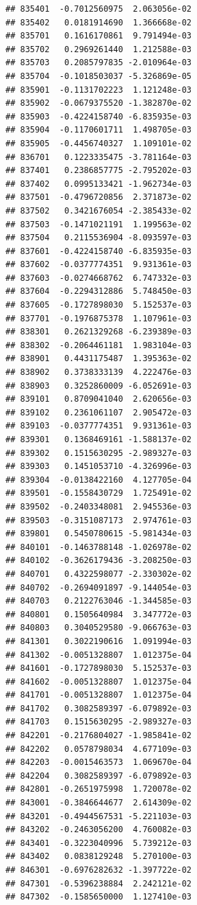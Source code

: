 \documentclass[ignorenonframetext,]{beamer}
\begin{document}
\begin{frame}[fragile]
\begin{verbatim}
## 835401  -0.7012560975  2.063056e-02
## 835402   0.0181914690  1.366668e-02
## 835701   0.1616170861  9.791494e-03
## 835702   0.2969261440  1.212588e-03
## 835703   0.2085797835 -2.010964e-03
## 835704  -0.1018503037 -5.326869e-05
## 835901  -0.1131702223  1.121248e-03
## 835902  -0.0679375520 -1.382870e-02
## 835903  -0.4224158740 -6.835935e-03
## 835904  -0.1170601711  1.498705e-03
## 835905  -0.4456740327  1.109101e-02
## 836701   0.1223335475 -3.781164e-03
## 837401   0.2386857775 -2.795202e-03
## 837402   0.0995133421 -1.962734e-03
## 837501  -0.4796720856  2.371873e-02
## 837502   0.3421676054 -2.385433e-02
## 837503  -0.1471021191  1.199563e-02
## 837504   0.2115536904 -8.093597e-03
## 837601  -0.4224158740 -6.835935e-03
## 837602  -0.0377774351  9.931361e-03
## 837603  -0.0274668762  6.747332e-03
## 837604  -0.2294312886  5.748450e-03
## 837605  -0.1727898030  5.152537e-03
## 837701  -0.1976875378  1.107961e-03
## 838301   0.2621329268 -6.239389e-03
## 838302  -0.2064461181  1.983104e-03
## 838901   0.4431175487  1.395363e-02
## 838902   0.3738333139  4.222476e-03
## 838903   0.3252860009 -6.052691e-03
## 839101   0.8709041040  2.620656e-03
## 839102   0.2361061107  2.905472e-03
## 839103  -0.0377774351  9.931361e-03
## 839301   0.1368469161 -1.588137e-02
## 839302   0.1515630295 -2.989327e-03
## 839303   0.1451053710 -4.326996e-03
## 839304  -0.0138422160  4.127705e-04
## 839501  -0.1558430729  1.725491e-02
## 839502  -0.2403348081  2.945536e-03
## 839503  -0.3151087173  2.974761e-03
## 839801   0.5450780615 -5.981434e-03
## 840101  -0.1463788148 -1.026978e-02
## 840102  -0.3626179436 -3.208250e-03
## 840701   0.4322598077 -2.330302e-02
## 840702  -0.2694091897 -9.144054e-03
## 840703   0.2122763046 -1.344585e-03
## 840801   0.1505640984  3.347772e-03
## 840803   0.3040529580 -9.066763e-03
## 841301   0.3022190616  1.091994e-03
## 841302  -0.0051328807  1.012375e-04
## 841601  -0.1727898030  5.152537e-03
## 841602  -0.0051328807  1.012375e-04
## 841701  -0.0051328807  1.012375e-04
## 841702   0.3082589397 -6.079892e-03
## 841703   0.1515630295 -2.989327e-03
## 842201  -0.2176804027 -1.985841e-02
## 842202   0.0578798034  4.677109e-03
## 842203  -0.0015463573  1.069670e-04
## 842204   0.3082589397 -6.079892e-03
## 842801  -0.2651975998  1.720078e-02
## 843001  -0.3846644677  2.614309e-02
## 843201  -0.4944567531 -5.221103e-03
## 843202  -0.2463056200  4.760082e-03
## 843401  -0.3223040996  5.739212e-03
## 843402   0.0838129248  5.270100e-03
## 846301  -0.6976282632 -1.397722e-02
## 847301  -0.5396238884  2.242121e-02
## 847302  -0.1585650000  1.127410e-03

\end{verbatim}
\end{frame}
\end{document}
